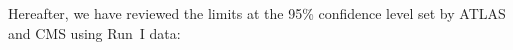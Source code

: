 Hereafter, we have reviewed the limits at the 95\% confidence level set by ATLAS and CMS using Run~I data:

